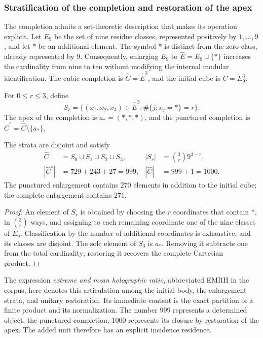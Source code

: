 \subsubsection{Stratification of the completion and restoration of the apex}
\label{sec:revision-emrh}

The completion admits a set-theoretic description that makes its
operation explicit. Let \(E_9\) be the set of nine residue classes, represented
positively by \(1,\ldots,9\), and let \(\ast\) be an additional element.
The symbol \(\ast\) is distinct from the zero class, already represented by \(9\).
Consequently, enlarging \(E_9\) to
\(\widehat E=E_9\sqcup\{\ast\}\) increases the cardinality from nine to ten
without modifying the internal modular identification. The cubic completion is
\(\widehat C=\widehat E^3\), and the initial cube is \(C=E_9^3\).

\begin{definition}
For \(0\leq r\leq3\), define
\[
 S_r=\{(x_1,x_2,x_3)\in\widehat E^3:
             \#\{j:x_j=\ast\}=r\}.
\]
The apex of the completion is \(a_\ast=(\ast,\ast,\ast)\), and the
punctured completion is \(\widehat C^{\circ}=\widehat C\setminus\{a_\ast\}\).
\end{definition}

\begin{proposition}
The strata are disjoint and satisfy
\begin{align}
 \widehat C&=S_0\sqcup S_1\sqcup S_2\sqcup S_3,
 &|S_r|&=\binom3r9^{3-r},\label{eq:revision-estratos}\\
 |\widehat C^{\circ}|&=729+243+27=999,
 &|\widehat C|&=999+1=1000.\label{eq:revision-999}
\end{align}
The punctured enlargement contains \(270\) elements in addition to the initial
cube; the complete enlargement contains \(271\).
\end{proposition}
\begin{proof}
An element of \(S_r\) is obtained by choosing the \(r\) coordinates that
contain \(\ast\), in \(\binom3r\) ways, and assigning to each remaining coordinate
one of the nine classes of \(E_9\). Classification by the number of
additional coordinates is exhaustive, and its classes are disjoint. The sole
element of \(S_3\) is \(a_\ast\). Removing it subtracts one from the total
cardinality; restoring it recovers the complete Cartesian product.
\end{proof}

The expression \emph{extreme and mean holographic ratio}, abbreviated EMRH in
the corpus, here denotes this articulation among the initial body, the
enlargement strata, and unitary restoration. Its immediate content
is the exact partition of a finite product and its normalization. The number
\(999\) represents a determined object, the punctured completion;
\(1000\) represents its closure by restoration of the apex. The added
unit therefore has an explicit incidence residence.


